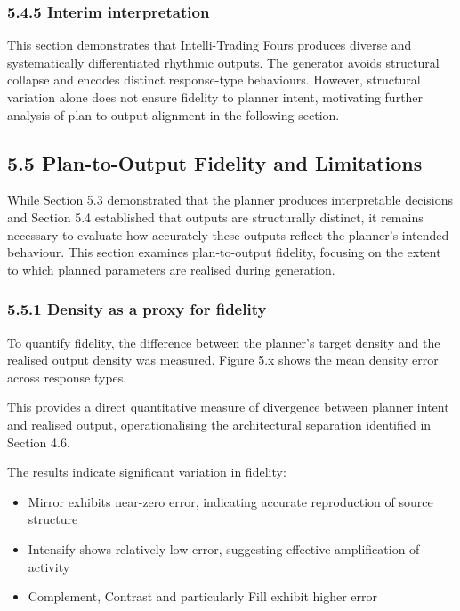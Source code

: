 \subsubsection{5.4.5 Interim
interpretation}\label{interim-interpretation-1}

This section demonstrates that Intelli-Trading Fours produces diverse
and systematically differentiated rhythmic outputs. The generator avoids
structural collapse and encodes distinct response-type behaviours.
However, structural variation alone does not ensure fidelity to planner
intent, motivating further analysis of plan-to-output alignment in the
following section.

\subsection{5.5 Plan-to-Output Fidelity and
Limitations}\label{plan-to-output-fidelity-and-limitations}

While Section 5.3 demonstrated that the planner produces interpretable
decisions and Section 5.4 established that outputs are structurally
distinct, it remains necessary to evaluate how accurately these outputs
reflect the planner's intended behaviour. This section examines
plan-to-output fidelity, focusing on the extent to which planned
parameters are realised during generation.

\subsubsection{5.5.1 Density as a proxy for
fidelity}\label{density-as-a-proxy-for-fidelity}

To quantify fidelity, the difference between the planner's target
density and the realised output density was measured. Figure 5.x shows
the mean density error across response types.

This provides a direct quantitative measure of divergence between
planner intent and realised output, operationalising the architectural
separation identified in Section 4.6.

The results indicate significant variation in fidelity:

\begin{itemize}
\item
  Mirror exhibits near-zero error, indicating accurate reproduction of
  source structure
\item
  Intensify shows relatively low error, suggesting effective
  amplification of activity
\item
  Complement, Contrast and particularly Fill exhibit higher error
\end{itemize}

